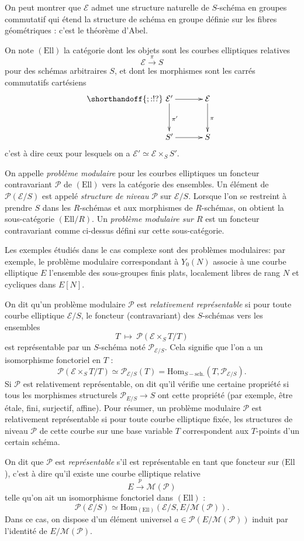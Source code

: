 \documentclass[11pt,a4paper]{article}
\newcommand{\E}{\mathcal{E}}
\renewcommand{\Pr}{\mathcal{P}}
\newcommand{\M}{\mathcal{M}}
\newcommand{\vers}{\longrightarrow}
\newcommand{\Hom}{\mathrm{Hom}}
\newcommand{\Ell}{\mathrm{Ell}}
\renewcommand{\v}{\vspace{5mm}}
\theoremstyle{definition}
\begin{document}
On peut montrer que $\E$ admet une structure naturelle de $S$-schéma en groupes commutatif qui étend la structure de schéma en groupe définie sur les fibres géométriques : c'est le théorème d'Abel.
\v

On note $(\Ell)$ la catégorie dont les objets sont les courbes elliptiques relatives
$$\E \overset{\pi}{\vers} S$$
pour des schémas arbitraires $S$, et dont les morphismes sont les carrés commutatifs cartésiens
$$
\shorthandoff{;:!?}
\xymatrix @!=8mm {
\E' \ar[d]^{\pi'} \ar[r]  & \E \ar[d]^{\pi} \\
 S' \ar[r] & S
}
$$
c'est à dire ceux pour lesquels on a $\E' \simeq \E \times_S S'$.

On appelle \emph{problème modulaire} pour les courbes elliptiques un foncteur contravariant $\Pr$ de $(\Ell)$ vers la catégorie des ensembles. Un élément de $\Pr(\E/S)$ est appelé \emph{structure de niveau} $\Pr$ sur $\E/S$. Lorsque l'on se restreint à prendre $S$ dans les $R$-schémas et aux morphismes de $R$-schémas, on obtient la sous-catégorie $(\Ell/R)$. Un \emph{problème modulaire sur $R$} est un foncteur contravariant comme ci-dessus défini sur cette sous-catégorie.


Les exemples étudiés dans le cas complexe sont des problèmes modulaires: par exemple, le problème modulaire correspondant à $Y_0(N)$ associe à une courbe elliptique $E$ l'ensemble des sous-groupes finis plats, localement libres de rang $N$ et cycliques dans $E[N]$.

\vspace{5mm}

On dit qu'un problème modulaire $\Pr$ est \emph{relativement représentable} si pour toute courbe elliptique $\E/S$, le foncteur (contravariant) des $S$-schémas vers les ensembles
$$T \ \longmapsto\ \Pr(\E\times_S T / T)$$
est représentable par un $S$-schéma noté $\Pr_{\E/S}$. Cela signifie que l'on a un isomorphisme fonctoriel en $T$ :
$$\Pr(\E\times_S T / T) \simeq \Pr_{\E/S}(T) = \Hom_{S-\text{sch.}}(T, \Pr_{\E/S}).$$
Si $\Pr$ est relativement représentable, on dit qu'il vérifie une certaine propriété si tous les morphismes structurels $\Pr_{E/S}\vers S$ ont cette propriété (par exemple, être étale, fini, surjectif, affine). Pour résumer, un problème modulaire $\Pr$ est relativement représentable si pour toute courbe elliptique fixée, les structures de niveau $\Pr$ de cette courbe sur une base variable $T$ correspondent aux $T$-points d'un certain schéma.

On dit que $\Pr$ est \emph{représentable} s'il est représentable en tant que foncteur sur $(\Ell$), c'est à dire qu'il existe une courbe elliptique relative
$$E \overset{p}\vers \M(\Pr)$$
telle qu'on ait un isomorphisme fonctoriel dans $(\Ell)$ :
$$\Pr(\E/S) \simeq \Hom_{(\Ell)}(\E/S, E/\M(\Pr)).$$
Dans ce cas, on dispose d'un élément universel $a\in \Pr(E/\M(\Pr))$ induit par l'identité de $E/\M(\Pr)$.
\end{document}
